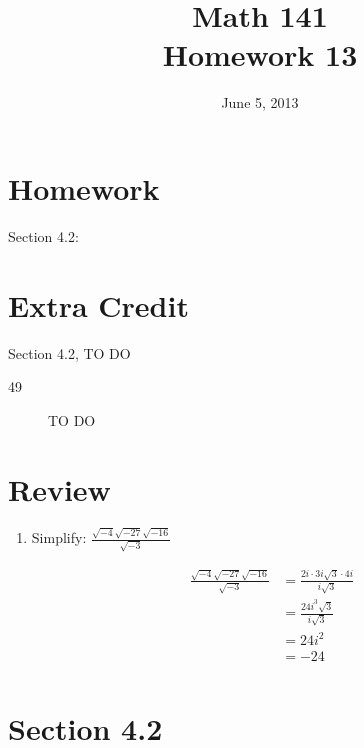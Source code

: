 \documentclass{exam}
\date{June 5, 2013}
\author{}
\title{Math 141 \\ Homework 13}
\begin{document}
  \maketitle

  \section{Homework}

  Section 4.2: 

  \section{Extra Credit}
  Section 4.2, TO DO

  \ifprintanswers
    \begin{description}
      \item[49] TO DO
    \end{description}

  \section{Review}

  \begin{enumerate}
    \item Simplify: $\frac{\sqrt{-4}\sqrt{-27}\sqrt{-16}}{\sqrt{-3}}$
      \begin{solution}
        \begin{align*}
          \frac{\sqrt{-4}\sqrt{-27}\sqrt{-16}}{\sqrt{-3}} &= \frac{2i \cdot 3i \sqrt{3} \cdot 4i}{i \sqrt{3}} \\
          &= \frac{24i^3 \sqrt{3}}{i \sqrt{3}} \\
          &= 24 i^2 \\
          &= -24 \\
        \end{align*}
      \end{solution}

  \end{enumerate}
    \section{Section 4.2}
\end{document}
